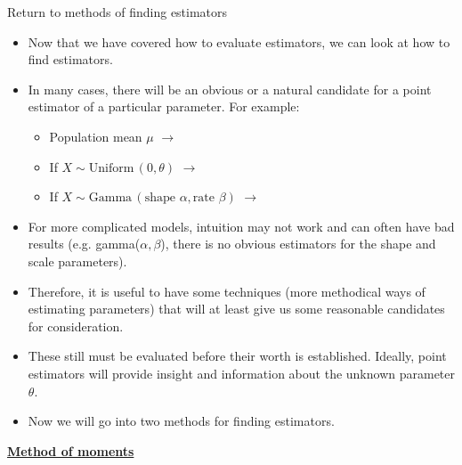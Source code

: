 \documentclass{article}
\newcommand{\bu}[1]{\textbf{\ul{#1}}}				%
\newcommand{\follow}[1]{\sim \text{#1}\,}		%
\begin{document}
\newpage

Return to methods of finding estimators\bigskip
\begin{itemize}
    \item Now that we have covered how to evaluate estimators, we can look at how to find estimators.
    \item In many cases, there will be an obvious or a natural candidate for a point estimator of a particular parameter. For example:
    \begin{itemize}
        \item Population mean $\mu$ $\rightarrow$
        \item If $X \follow{Uniform}(0, \theta)$ $\rightarrow$
        \item If $X \follow{Gamma}(\text{shape } \alpha, \text{rate } \beta)$ $\rightarrow$
    \end{itemize}
    \item For more complicated models, intuition may not work and can often have bad results (e.g. gamma($\alpha, \beta$), there is no obvious estimators for the shape and scale parameters).
    \item Therefore, it is useful to have some techniques (more methodical ways of estimating parameters) that will at least give us some reasonable candidates for consideration.
    \item[] These still must be evaluated before their worth is established. Ideally, point estimators will provide insight and information about the unknown parameter $\theta$.
    \item Now we will go into two methods for finding estimators.
\end{itemize}\bigskip

\bu{Method of moments}\bigskip
\end{document}
